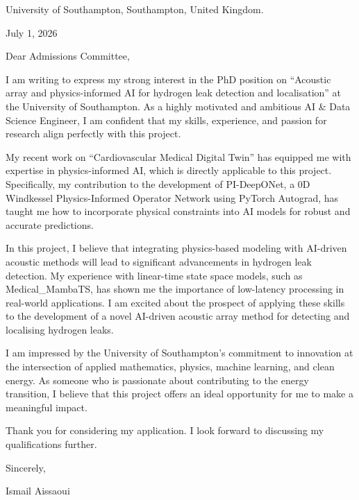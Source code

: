 \documentclass[11pt]{letter}
\begin{document}
\opening{\noindent}

University of Southampton,
Southampton, United Kingdom.

July 1, 2026

Dear Admissions Committee,

I am writing to express my strong interest in the PhD position on ``Acoustic array and physics-informed AI for hydrogen leak detection and localisation'' at the University of Southampton. As a highly motivated and ambitious AI & Data Science Engineer, I am confident that my skills, experience, and passion for research align perfectly with this project.

My recent work on ``Cardiovascular Medical Digital Twin'' has equipped me with expertise in physics-informed AI, which is directly applicable to this project. Specifically, my contribution to the development of PI-DeepONet, a 0D Windkessel Physics-Informed Operator Network using PyTorch Autograd, has taught me how to incorporate physical constraints into AI models for robust and accurate predictions.

In this project, I believe that integrating physics-based modeling with AI-driven acoustic methods will lead to significant advancements in hydrogen leak detection. My experience with linear-time state space models, such as Medical_MambaTS, has shown me the importance of low-latency processing in real-world applications. I am excited about the prospect of applying these skills to the development of a novel AI-driven acoustic array method for detecting and localising hydrogen leaks.

I am impressed by the University of Southampton's commitment to innovation at the intersection of applied mathematics, physics, machine learning, and clean energy. As someone who is passionate about contributing to the energy transition, I believe that this project offers an ideal opportunity for me to make a meaningful impact.

Thank you for considering my application. I look forward to discussing my qualifications further.

Sincerely,

Ismail Aissaoui

\closing{}
\end{document}
